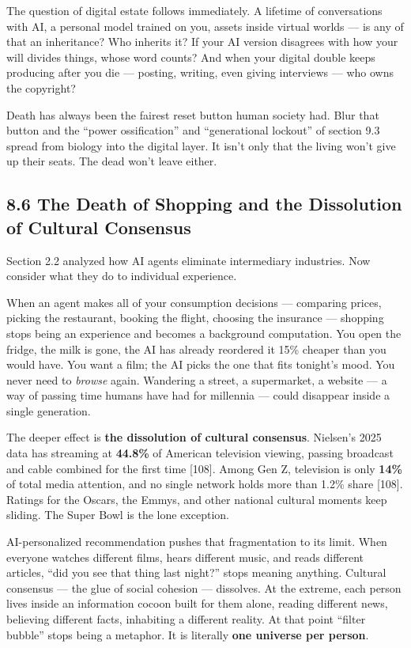 \documentclass[11pt,a4paper]{article}
\begin{document}
The question of digital estate follows immediately. A lifetime of conversations with AI, a personal model trained on you, assets inside virtual worlds --- is any of that an inheritance? Who inherits it? If your AI version disagrees with how your will divides things, whose word counts? And when your digital double keeps producing after you die --- posting, writing, even giving interviews --- who owns the copyright?

Death has always been the fairest reset button human society had. Blur that button and the ``power ossification'' and ``generational lockout'' of section 9.3 spread from biology into the digital layer. It isn't only that the living won't give up their seats. The dead won't leave either.

\subsection{8.6 The Death of Shopping and the Dissolution of Cultural Consensus}

Section 2.2 analyzed how AI agents eliminate intermediary industries. Now consider what they do to individual experience.

When an agent makes all of your consumption decisions --- comparing prices, picking the restaurant, booking the flight, choosing the insurance --- shopping stops being an experience and becomes a background computation. You open the fridge, the milk is gone, the AI has already reordered it 15\% cheaper than you would have. You want a film; the AI picks the one that fits tonight's mood. You never need to \textit{browse} again. Wandering a street, a supermarket, a website --- a way of passing time humans have had for millennia --- could disappear inside a single generation.

The deeper effect is \textbf{the dissolution of cultural consensus}. Nielsen's 2025 data has streaming at \textbf{44.8\%} of American television viewing, passing broadcast and cable combined for the first time [108]. Among Gen Z, television is only \textbf{14\%} of total media attention, and no single network holds more than 1.2\% share [108]. Ratings for the Oscars, the Emmys, and other national cultural moments keep sliding. The Super Bowl is the lone exception.

AI-personalized recommendation pushes that fragmentation to its limit. When everyone watches different films, hears different music, and reads different articles, ``did you see that thing last night?'' stops meaning anything. Cultural consensus --- the glue of social cohesion --- dissolves. At the extreme, each person lives inside an information cocoon built for them alone, reading different news, believing different facts, inhabiting a different reality. At that point ``filter bubble'' stops being a metaphor. It is literally \textbf{one universe per person}.
\end{document}
